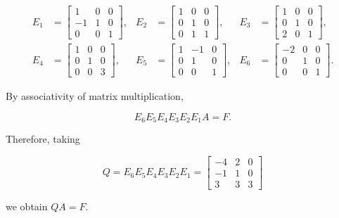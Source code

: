 \begin{enumerate}[label=\alph*)]
\begin{answer}
        $$
        \begin{aligned}
        E_1 &=
        \begin{bmatrix}
            1 & 0 & 0 \\
            -1 & 1 & 0 \\
            0 & 0 & 1
        \end{bmatrix},
        &
        E_2 &=
        \begin{bmatrix}
            1 & 0 & 0 \\
            0 & 1 & 0 \\
            0 & 1 & 1
        \end{bmatrix},
        &
        E_3 &=
        \begin{bmatrix}
            1 & 0 & 0 \\
            0 & 1 & 0 \\
            2 & 0 & 1
        \end{bmatrix},
        \\[1em]
        E_4 &=
        \begin{bmatrix}
            1 & 0 & 0 \\
            0 & 1 & 0 \\
            0 & 0 & 3
        \end{bmatrix},
        &
        E_5 &=
        \begin{bmatrix}
            1 & -1 & 0 \\
            0 &  1 & 0 \\
            0 &  0 & 1
        \end{bmatrix},
        &
        E_6 &=
        \begin{bmatrix}
            -2 & 0 & 0 \\
            0 & 1 & 0 \\
            0 & 0 & 1
        \end{bmatrix}.
        \end{aligned}
        $$

        By associativity of matrix multiplication,

        $$
        E_6E_5E_4E_3E_2E_1A=F.
        $$

        Therefore, taking

        $$
        \boxed{
        Q=E_6E_5E_4E_3E_2E_1
        =
        \begin{bmatrix}
            -4 & 2 & 0 \\
            -1 & 1 & 0 \\
            3 & 3 & 3
        \end{bmatrix}
        }
        $$

        we obtain $\boxed{QA=F}$.
    \end{answer} \\[1.0em]

\end{enumerate}

